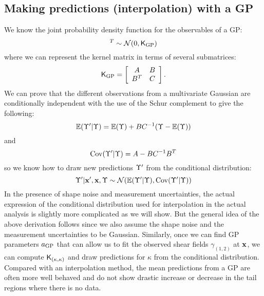 \subsection{Making predictions (interpolation) with a GP}
We know the joint probability density function for the observables of a GP:
\begin{equation}
	[\lensparams',\lensparams]^T \sim \mathcal{N}(0, \kerngp_{\rm GP})
\end{equation}
where we can represent the kernel matrix in terms of several submatrices:
\begin{equation}
	\mathsf{K}_{\rm GP} = \left[\begin{array}{cc}
	A & B \\
	B^T & C 
\end{array} \right].	
\end{equation}
We can prove that the different observations from a multivariate Gaussian are 
conditionally independent with the use of the Schur complement to give the following:
\begin{equation}
	\mathbb{E}(\Upsilon'|\Upsilon) = \mathbb{E}(\Upsilon) + BC^{-1}(\Upsilon - \mathbb{E}(\Upsilon))
\end{equation}
and
\begin{equation}
	\mathrm{Cov}(\Upsilon'|\Upsilon) = A - BC^{-1}B^T
\end{equation}
so we know how to draw new predictions $\Upsilon'$ from the conditional distribution:
\begin{equation} 
	\Upsilon' | \mathbf{x}', \mathbf{x}, \Upsilon \sim \mathcal{N}(
		\mathbb{E}(\Upsilon'| \Upsilon), \mathrm{Cov}(\Upsilon'|\Upsilon)
	)
\end{equation}
In the presence of shape noise and measurement uncertainties, the actual 
expression of the conditional distribution used for interpolation in the actual analysis 
is slightly more complicated as we will show. 
But the general idea of the above derivation follows 
since we also assume the shape noise and the measurement uncertainties to be Gaussian.
Similarly, once we can find GP parameters $a_{\rm GP}$ that can allow us to fit
the observed shear fields $\gamma_{(1, 2)}$ at $\mathbf{x}$, we can compute $\mathsf{K}_{(\kappa,
\kappa)}$ and draw predictions for $\kappa$ from the conditional distribution. 
Compared with an interpolation method, the mean predictions from a GP are
often more well behaved and do not show drastic increase or decrease 
in the tail regions where there is no data.  

